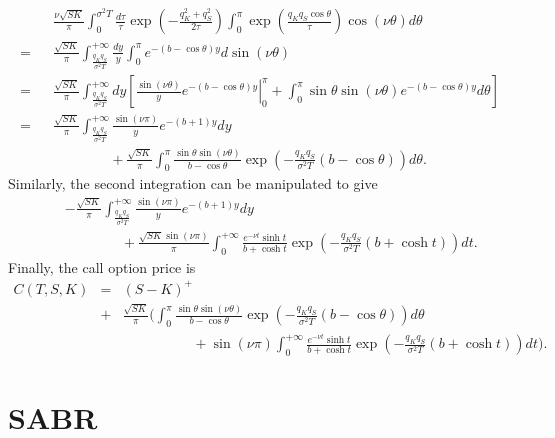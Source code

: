\documentclass[12pt]{article}
\begin{document}
  \begin{eqnarray}
    && \frac{\nu\sqrt{SK}}{\pi}\int_0^{\sigma^2 T}\frac{d\tau}{\tau}\exp\left(-\frac{q_K^2+q_S^2}{2\tau}\right)
       \int_0^{\pi}\exp\left(\frac{q_Kq_S\cos\theta}{\tau}\right)\cos(\nu\theta)d\theta\nonumber\\
    = && \frac{\sqrt{SK}}{\pi}\int_{\frac{q_Kq_S}{\sigma^2 T}}^{+\infty}\frac{dy}{y}
       \int_0^{\pi}e^{-(b-\cos\theta)y}d\sin(\nu\theta)\nonumber\\
    = && \frac{\sqrt{SK}}{\pi}\int_{\frac{q_Kq_S}{\sigma^2 T}}^{+\infty}dy
         \left[\left.\frac{\sin(\nu\theta)}{y}e^{-(b-\cos\theta)y}\right|_0^{\pi}
              +\int_0^{\pi}\sin\theta\sin(\nu\theta)e^{-(b-\cos\theta)y}d\theta\right]\nonumber\\
    = && \frac{\sqrt{SK}}{\pi}\int_{\frac{q_Kq_S}{\sigma^2 T}}^{+\infty}\frac{\sin(\nu\pi)}{y}e^{-(b+1)y}dy\nonumber\\
      && \quad\quad\quad\quad+ \frac{\sqrt{SK}}{\pi}\int_0^{\pi}\frac{\sin\theta\sin(\nu\theta)}{b-\cos\theta}
       \exp\left(-\frac{q_Kq_S}{\sigma^2T}\left(b-\cos\theta\right)\right)d\theta.
  \end{eqnarray}
  Similarly, the second integration can be manipulated to give
  \begin{eqnarray}
    && -\frac{\sqrt{SK}}{\pi}\int_{\frac{q_Kq_S}{\sigma^2 T}}^{+\infty}\frac{\sin(\nu\pi)}{y}e^{-(b+1)y}dy\nonumber\\
      && \quad\quad\quad\quad+ \frac{\sqrt{SK}\sin(\nu\pi)}{\pi}\int_0^{+\infty}\frac{e^{-\nu t}\sinh t}{b+\cosh t}
       \exp\left(-\frac{q_Kq_S}{\sigma^2T}\left(b+\cosh t\right)\right)dt.
  \end{eqnarray}
  Finally, the call option price is
  \begin{eqnarray}
    C(T,S,K) &=& (S-K)^+ \nonumber\\
             &+&\frac{\sqrt{SK}}{\pi}\Bigg(\int_0^{\pi}\frac{\sin\theta\sin(\nu\theta)}{b-\cos\theta}
                        \exp\left(-\frac{q_Kq_S}{\sigma^2T}\left(b-\cos\theta\right)\right)d\theta\nonumber\\
             &&\quad\quad\quad\quad\quad + \sin(\nu\pi)\int_0^{+\infty}\frac{e^{-\nu t}\sinh t}{b+\cosh t}
       \exp\left(-\frac{q_Kq_S}{\sigma^2T}\left(b+\cosh t\right)\right)dt\Bigg).
  \end{eqnarray}



\section{SABR}
\end{document}
